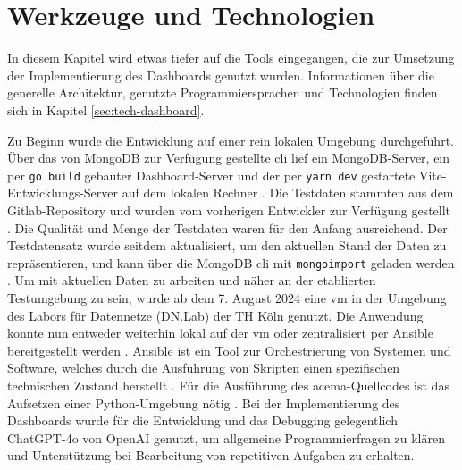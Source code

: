 \section{Werkzeuge und Technologien}
\label{sec:Entwicklungsumgebung}
In diesem Kapitel wird etwas tiefer auf die Tools eingegangen, die zur Umsetzung der Implementierung des Dashboards genutzt wurden. Informationen über die generelle Architektur, genutzte Programmiersprachen und Technologien finden sich in Kapitel \ref{sec:tech-dashboard}.
\par Zu Beginn wurde die Entwicklung auf einer rein lokalen Umgebung durchgeführt. Über das von MongoDB zur Verfügung gestellte \gls{cli} lief ein MongoDB-Server, ein per \verb|go build| gebauter Dashboard-Server und der per \verb|yarn dev| gestartete Vite-Entwicklungs-Server auf dem lokalen Rechner \autocite{MongoDBDeveloperData,Vite}. Die Testdaten stammten aus dem Gitlab-Repository und wurden vom vorherigen Entwickler zur Verfügung gestellt \autocite{AddExampleData2023}. Die Qualität und Menge der Testdaten waren für den Anfang ausreichend. Der Testdatensatz wurde seitdem aktualisiert, um den aktuellen Stand der Daten zu repräsentieren, und kann über die MongoDB \gls{cli} mit \verb|mongoimport| geladen werden \autocite{JSONMongoDB}. Um mit aktuellen Daten zu arbeiten und näher an der etablierten Testumgebung zu sein, wurde ab dem 7. August 2024 eine \gls{vm} in der Umgebung des Labors für Datennetze (DN.Lab) der TH Köln genutzt. Die Anwendung konnte nun entweder weiterhin lokal auf der \gls{vm} oder zentralisiert per Ansible bereitgestellt werden \autocite{HomepageAnsibleCollaborative}. Ansible ist ein Tool zur Orchestrierung von Systemen und Software, welches durch die Ausführung von Skripten einen spezifischen technischen Zustand herstellt \autocite{ansiblecollaboratorsHowAnsibleWorks2024}. Für die Ausführung des \gls{acema}-Quellcodes ist das Aufsetzen einer Python-Umgebung nötig \autocite{klement2023acema,WelcomePythonorg}. Bei der Implementierung des Dashboards wurde für die Entwicklung und das Debugging gelegentlich ChatGPT-4o von OpenAI genutzt, um allgemeine Programmierfragen zu klären und Unterstützung bei Bearbeitung von repetitiven Aufgaben zu erhalten.